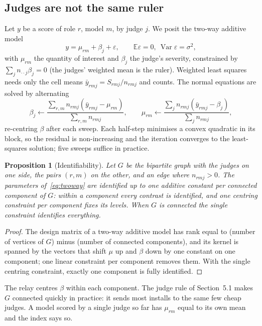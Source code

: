 \documentclass[10pt,a4paper]{article}
\newcommand{\E}{\mathbb{E}}
\newtheorem{proposition}{Proposition}
\theoremstyle{definition}
\theoremstyle{remark}
\begin{document}
\subsection{Judges are not the same ruler}

Let $y$ be a score of role $r$, model $m$, by judge $j$. We posit the two-way additive model
\begin{equation}
y=\mu_{rm}+\beta_j+\varepsilon,\qquad \E\varepsilon=0,\ \operatorname{Var}\varepsilon=\sigma^2,
\label{eq:twoway}
\end{equation}
with $\mu_{rm}$ the quantity of interest and $\beta_j$ the judge's severity, constrained by $\sum_j n_{\cdot\cdot j}\beta_j=0$ (the judges' weighted mean is the ruler). Weighted least squares needs only the cell means $\bar y_{rmj}=S_{rmj}/n_{rmj}$ and counts. The normal equations are solved by alternating
\begin{equation}
\beta_j\leftarrow\frac{\sum_{r,m} n_{rmj}(\bar y_{rmj}-\mu_{rm})}{\sum_{r,m} n_{rmj}},\qquad
\mu_{rm}\leftarrow\frac{\sum_{j} n_{rmj}(\bar y_{rmj}-\beta_j)}{\sum_{j} n_{rmj}},
\label{eq:als}
\end{equation}
re-centring $\beta$ after each sweep. Each half-step minimises a convex quadratic in its block, so the residual is non-increasing and the iteration converges to the least-squares solution; five sweeps suffice in practice.

\begin{proposition}[Identifiability]
\label{prop:ident}
Let $G$ be the bipartite graph with the judges on one side, the pairs $(r,m)$ on the other, and an edge where $n_{rmj}>0$. The parameters of~\eqref{eq:twoway} are identified up to one additive constant per connected component of $G$: within a component every contrast is identified, and one centring constraint per component fixes its levels. When $G$ is connected the single constraint identifies everything.
\end{proposition}
\begin{proof}
The design matrix of a two-way additive model has rank equal to (number of vertices of $G$) minus (number of connected components), and its kernel is spanned by the vectors that shift $\mu$ up and $\beta$ down by one constant on one component; one linear constraint per component removes them. With the single centring constraint, exactly one component is fully identified.
\end{proof}

The relay centres $\beta$ within each component. The judge rule of Section~5.1 makes $G$ connected quickly in practice: it sends most installs to the same few cheap judges. A model scored by a single judge so far has $\mu_{rm}$ equal to its own mean and the index says so.
\end{document}

